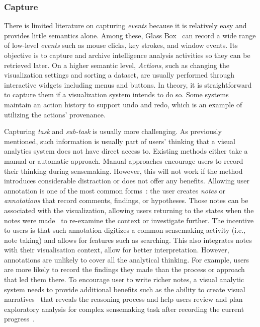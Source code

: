 \subsubsection{Capture}
There is limited literature on capturing \emph{events} because it is relatively easy and provides little semantics alone. Among these, Glass Box~\cite{Cowley2006} can record a wide range of low-level \textit{events} such as mouse clicks, key strokes, and window events. Its objective is to capture and archive intelligence analysis activities so they can be retrieved later. On a higher semantic level, \textit{Actions}, such as changing the visualization settings and sorting a dataset, are usually performed through interactive widgets including menus and buttons. In theory, it is straightforward to capture them if a visualization system intends to do so. Some systems~\cite{Shrinivasan2008} maintain an action history to support undo and redo, which is an example of utilizing the actions' provenance.

Capturing \textit{task} and \textit{sub-task} is usually more challenging. As previously mentioned, such information is usually part of users' thinking that a visual analytics system does not have direct access to. Existing methods either take a manual or automatic approach. Manual approaches encourage users to record their thinking during sensemaking. However, this will not work if the method introduces considerable distraction or does not offer any benefits. Allowing user annotation is one of the most common forms~\cite{diva,schemaline}: the user creates \emph{notes} or \emph{annotations} that record comments, findings, or hypotheses. Those notes can be associated with the visualization, allowing users returning to the states when the notes were made~\cite{Pike2007, Shrinivasan2008} to re-examine the context or investigate further. The incentive to users is that such annotation digitizes a common sensemaking activity (i.e., note taking) and allows for features such as searching.  This also integrates notes with their visualisation context, allow for better interpretation. However, annotations are unlikely to cover all the analytical thinking. For example, users are more likely to record the findings they made than the process or approach that led them there. To encourage user to write richer notes, a visual analytic system needs to provide additional benefits such as the ability to create visual narratives~\cite{diva} that reveals the reasoning process and help users review and plan exploratory analysis for complex sensemaking task after recording the current progress~\cite{Lunzer2014}.

